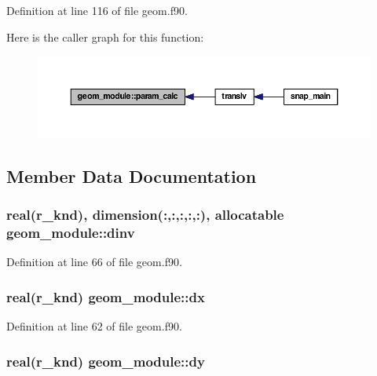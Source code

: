 Definition at line 116 of file geom.\-f90.



Here is the caller graph for this function\-:\nopagebreak
\begin{figure}[H]
\begin{center}
\leavevmode
\includegraphics[width=350pt]{classgeom__module_aa09319572e809c686211758ef5fb129e_icgraph}
\end{center}
\end{figure}




\subsection{Member Data Documentation}
\hypertarget{classgeom__module_ae4c351982371a6870429ab660ec35e45}{
\subsubsection[{dinv}]{\setlength{\rightskip}{0pt plus 5cm}real(r\-\_\-knd), dimension(\-:,\-:,\-:,\-:,\-:), allocatable geom\-\_\-module\-::dinv}}\label{classgeom__module_ae4c351982371a6870429ab660ec35e45}


Definition at line 66 of file geom.\-f90.

\hypertarget{classgeom__module_a2f292c19b0e9bfc4cde1d54f0e9d4472}{
\subsubsection[{dx}]{\setlength{\rightskip}{0pt plus 5cm}real(r\-\_\-knd) geom\-\_\-module\-::dx}}\label{classgeom__module_a2f292c19b0e9bfc4cde1d54f0e9d4472}


Definition at line 62 of file geom.\-f90.

\hypertarget{classgeom__module_a13234163c83c1041d8053ab0f4ea5d40}{
\subsubsection[{dy}]{\setlength{\rightskip}{0pt plus 5cm}real(r\-\_\-knd) geom\-\_\-module\-::dy}}\label{classgeom__module_a13234163c83c1041d8053ab0f4ea5d40}


